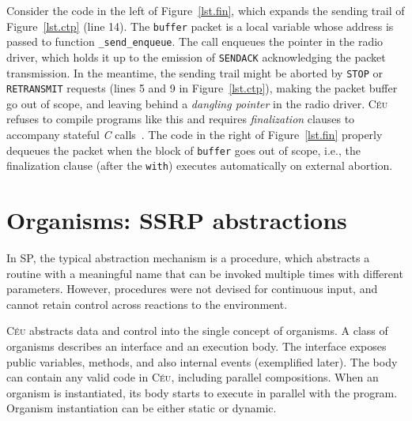 \documentclass[preprint]{sigplanconf}
\newcommand{\CEU}{\textsc{C\'{e}u}\xspace}
\newcommand{\code}[1] {{\small{\texttt{#1}}}}
\newcommand{\1}{\;}
\newcommand{\2}{\;\;}
\newcommand{\3}{\;\;\;}
\newcommand{\5}{\;\;\;\;\;}
\begin{document}
Consider the code in the left of Figure~\ref{lst.fin}, which expands the 
sending trail of Figure~\ref{lst.ctp} (line 14).
%
The \code{buffer} packet is a local variable whose address is passed to 
function \code{\_send\_enqueue}.
The call enqueues the pointer in the radio driver, which holds it up to the 
emission of \code{SENDACK} acknowledging the packet transmission.
%
In the meantime, the sending trail might be aborted by \code{STOP} or 
\code{RETRANSMIT} requests (lines 5 and 9 in Figure~\ref{lst.ctp}), making the 
packet buffer go out of scope, and leaving behind a \emph{dangling pointer} in 
the radio driver.
%
\CEU refuses to compile programs like this and requires \emph{finalization} 
clauses to accompany stateful \emph{C} calls~\cite{ceu.sensys13}.
The code in the right of Figure~\ref{lst.fin} properly dequeues the packet when
the block of \code{buffer} goes out of scope, i.e., the finalization clause 
(after the \code{with}) executes automatically on external abortion.

\section{Organisms: SSRP abstractions}
\label{sec.orgs}


%
In SP, the typical abstraction mechanism is a procedure, which abstracts a 
routine with a meaningful name that can be invoked multiple times with 
different parameters.
%
However, procedures were not devised for continuous input, and cannot retain 
control across reactions to the environment.
%

\CEU abstracts data and control into the single concept of organisms.
%
A class of organisms describes an interface and an execution body.
The interface exposes public variables, methods, and also internal events 
(exemplified later).
The body can contain any valid code in \CEU, including parallel compositions.
When an organism is instantiated, its body starts to execute in parallel with 
the program.
Organism instantiation can be either static or dynamic.
\end{document}
